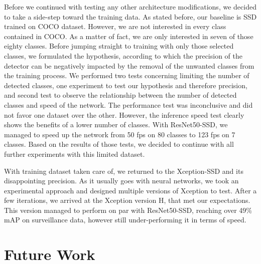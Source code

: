 Before we continued with testing any other architecture modifications, we decided to take a side-step toward the training data. As stated before, our baseline is SSD trained on COCO dataset. However, we are not interested in every class contained in COCO. As a matter of fact, we are only interested in seven of those eighty classes. Before jumping straight to training with only those selected classes, we formulated the hypothesis, according to which the precision of the detector can be negatively impacted by the removal of the unwanted classes from the training process. We performed two tests concerning limiting the number of detected classes, one experiment to test our hypothesis and therefore precision, and second test to observe the relationship between the number of detected classes and speed of the network. The performance test was inconclusive and did not favor one dataset over the other. However, the inference speed test clearly shows the benefits of a lower number of classes. With ResNet50-SSD, we managed to speed up the network from 50 fps on 80 classes to 123 fps on 7 classes. Based on the results of those tests, we decided to continue with all further experiments with this limited dataset.

With training dataset taken care of, we returned to the Xception-SSD and its disappointing precision. As it usually goes with neural networks, we took an experimental approach and designed multiple versions of Xception to test. After a few iterations, we arrived at the Xception version H, that met our expectations. This version managed to perform on par with ResNet50-SSD, reaching over 49\% mAP on surveillance data, however still under-performing it in terms of speed. 



\section{Future Work}




